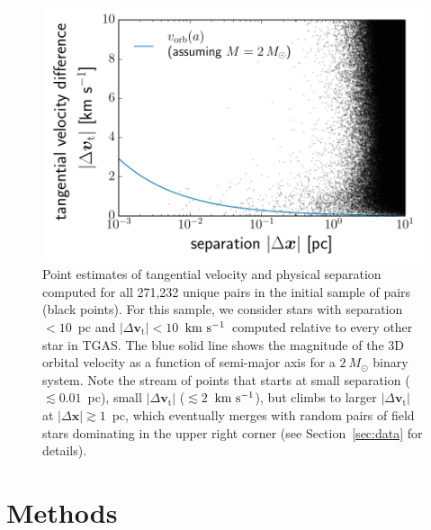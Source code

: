 \documentclass[manuscript, letterpaper]{aastex6}
\newcommand{\acronym}[1]{{\small{#1}}}
\newcommand{\sectionname}{Section}
\newcommand{\tgas}{\acronym{TGAS}}
\newcommand{\bs}[1]{\boldsymbol{#1}}
\renewcommand{\vec}[1]{\bs{#1}}
\newcommand{\kms}{\ensuremath{\rm km~s^{-1}}}
\newcommand{\absdvtan}{\ensuremath{|\Delta\vec v_\mathrm{t}|}}
\begin{document}
\begin{figure}[htbp]
  \begin{center}
    \includegraphics[width=\textwidth]{figures/sep_dvtan.pdf}
  \end{center}
  \caption{%
    Point estimates of tangential velocity and physical separation computed for
    all 271,232 unique pairs in the initial sample of pairs (black points).
    For this sample, we consider stars
    with separation $< 10$~pc and $\absdvtan < 10$~\kms\
    computed relative to every other star in \tgas.
    The blue solid line shows the magnitude of the 3D
    orbital velocity as a function of semi-major axis for a $2~M_\odot$ binary system.
    Note the stream of points that starts at small separation ($\lesssim 0.01$~pc),
    small $\absdvtan$ ($\lesssim 2$~\kms),
    but climbs to larger $\absdvtan$ at $|\Delta \vec{x}|\gtrsim 1$~pc, which
    eventually merges with random pairs of field stars dominating in the upper right corner
    (see \sectionname~\ref{sec:data} for details).
    \label{fig:dv-sep}}
\end{figure}

\section{Methods} \label{sec:methods}
\end{document}
